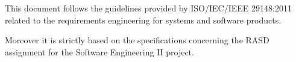 This document follows the guidelines provided by ISO/IEC/IEEE 29148:2011 related to the requirements engineering for systems and software products.

Moreover it is strictly based on the specifications concerning the RASD assignment for the Software Engineering II project.